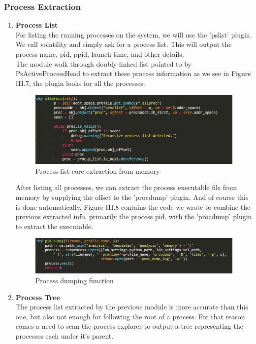 \subsubsection{Process Extraction}
\begin{enumerate}[label=(\alph*)]
    \item \textbf{Process List}\\
    For listing the running processes on the system, we will use the 'pslist' plugin. We call volatility and simply ask for a process list. This will output the process name, pid, ppid, launch time, and other details.\\
    The module walk through doubly-linked list pointed to by PsActiveProcessHead to extract these process information as we see in Figure III.7, the plugin looks for all the processes.\\
    \begin{figure}[H]
    \centering
    \includegraphics[width=0.8\columnwidth]{Figures/pslist.png}
    \caption{Process list core extraction from memory}
    \end{figure}
    After listing all processes, we can extract the process executable file from memory by supplying the offset to the 'procdump' plugin. And of course this is done automatically. Figure III.8 contains the code we wrote to combine the previous extracted info, primarily the process pid, with the 'procdump' plugin to extract the executable.
    \begin{figure}[H]
    \centering
    \includegraphics[width=0.8\columnwidth]{Figures/psdump.png}
    \caption{Process dumping function}
    \end{figure}
    \item \textbf{Process Tree}\\
    The process list extracted by the previous module is more accurate than this one, but also not enough for following the root of a process. For that reason comes a need to scan the process explorer to output a tree representing the processes each under it's parent.\\

\end{enumerate}
